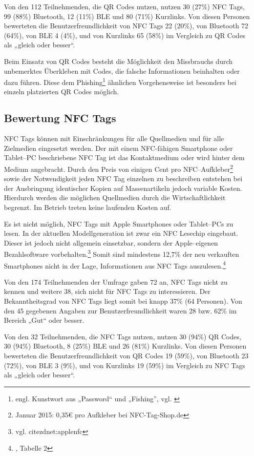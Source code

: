 Von den 112 Teilnehmenden, die QR Codes nutzen, nutzen 30 (27\%) NFC Tags, 99 (88\%) Bluetooth, 12 (11\%) \ac{BLE} und 80 (71\%) Kurzlinks. Von diesen Personen bewerteten die  Benutzerfreundlichkeit von NFC Tags 22 (20\%), von Bluetooth 72 (64\%), von \ac{BLE} 4 (4\%), und von Kurzlinks 65 (58\%) im Vergleich zu QR Codes als „gleich oder besser“.

Beim Einsatz von QR Codes besteht die Möglichkeit den Missbrauchs durch unbemerktes Überkleben mit Codes, die falsche Informationen beinhalten oder dazu führen. Diese dem Phishing\footnote{engl. Kunstwort aus „Password“ und „Fishing”, vgl. \cite{bsi:phishing}} ähnlichen Vorgehensweise ist besonders bei einzeln platzierten QR Codes möglich. 

\subsection{Bewertung NFC Tags} %
\label{sub:bewertung_nfc_tags}
NFC Tags können mit Einschränkungen für alle Quellmedien und für alle Zielmedien eingesetzt werden. Der mit einem NFC-fähigen Smartphone oder Tablet–PC beschriebene NFC Tag ist das Kontaktmedium oder wird hinter dem Medium angebracht. Durch den Preis von einigen Cent pro NFC–Aufkleber\footnote{Januar 2015: 0,35€ pro Aufkleber bei NFC-Tag-Shop.de} sowie der Notwendigkeit jeden NFC Tag einzelnen zu beschreiben entstehen bei der Ausbringung identischer Kopien auf Massenartikeln jedoch variable Kosten. Hierdurch werden die möglichen Quellmedien durch die Wirtschaftlichkeit begrenzt. Im Betrieb treten keine laufenden Kosten auf.

Es ist nicht möglich, NFC Tags mit Apple Smartphones oder Tablet–PCs zu lesen. In der aktuellen Modellgeneration ist zwar ein NFC Lesechip eingebaut. Dieser ist jedoch nicht allgemein einsetzbar, sondern der Apple–eigenen Bezahlsoftware vorbehalten.\footnote{vgl. cite{zdnet:applenfc}}
Somit sind mindestens 12,7\% der neu verkauften Smartphones nicht in der Lage, Informationen aus NFC Tags auszulesen.\footnote{\cite{garnter:os}, Tabelle 2}

Von den 174 Teilnehmenden der Umfrage gaben 72 an, NFC Tags nicht zu kennen und weitere 38, sich nicht für NFC Tags zu interessieren. Der Bekanntheitsgrad von NFC Tags liegt somit bei knapp 37\% (64 Personen). Von den 45 gegebenen Angaben zur Benutzerfreundlichkeit waren 28 bzw. 62\% im Bereich „Gut“ oder besser. 

Von den 32 Teilnehmenden, die NFC Tags nutzen, nutzen 30 (94\%) QR Codes, 30 (94\%) Bluetooth, 8 (25\%) \ac{BLE} und 26 (81\%) Kurzlinks. Von diesen Personen bewerteten die  Benutzerfreundlichkeit von QR Codes 19 (59\%), von Bluetooth 23 (72\%), von \ac{BLE} 3 (9\%), und von Kurzlinks 19 (59\%) im Vergleich zu NFC Tags als „gleich oder besser“.

